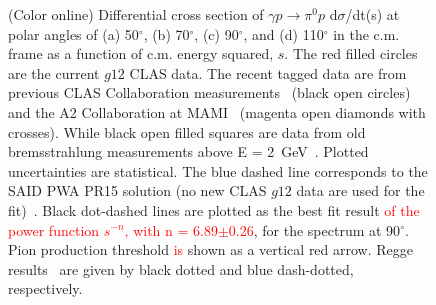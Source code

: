 \documentclass[aps,prc,twocolumn,floatfix,showpacs,preprintnumbers,amsmath,amssymb,superscriptaddress,linenumbers]{revtex4-1}
\begin{document}
\begin{figure}[htb!]
        \caption {(Color online) Differential cross section of 
	$\gamma p\rightarrow\pi^0p$ d$\sigma$/dt(s) at polar angles 
	of (a) 50$^\circ$, (b) 70$^\circ$, 
	(c) 90$^\circ$, and (d) 
	110$^\circ$ in the c.m. frame as a function of c.m. energy 
	squared, $s$. The red filled circles are the current $g12$ 
	CLAS data. The recent tagged data are from previous 
	CLAS Collaboration 
	measurements~\protect\cite{Dugger:2007bt} (black open 
	circles) and the A2 Collaboration at 
	MAMI~\protect\cite{Adlarson:2015byy} 
	(magenta open diamonds with crosses). While black open filled 
	squares are data from old bremsstrahlung measurements above 
	E = 2~GeV~\protect\cite{brem}. Plotted uncertainties are 
	statistical.  
	The blue dashed line corresponds to the SAID PWA 
	PR15 solution (no new CLAS $g12$ data are used 
	for the fit)~\protect\cite{Adlarson:2015byy}.  Black dot-dashed 
	lines are plotted as the best fit result \textcolor{red}{of the power function $s^{-n}$, with n = 6.89$\pm$0.26}, for the spectrum at 
	90$^\circ$. Pion production threshold \textcolor{red}{is} shown as a vertical 
	red arrow. Regge results~\protect\cite{Goldstein:1973xn,
	Laget:2005be} are given by black dotted and blue dash-dotted, 
	respectively.} \label{fig:scaling}
\end{figure}
\end{document}

